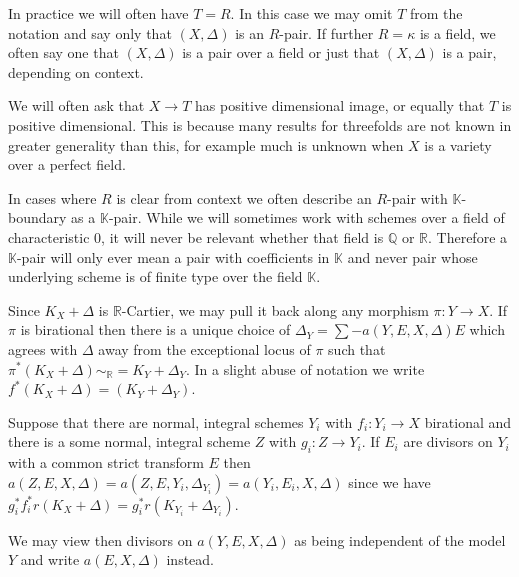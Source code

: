 \documentclass[a4paper,12pt]{book}
\begin{document}
%	

In practice we will often have $T=R$. In this case we may omit $T$ from the notation and say only that $(X,\Delta)$ is an $R$-pair. If further $R=\kappa$ is a field, we often say one that $(X,\Delta)$ is a pair over a field or just that $(X,\Delta)$ is a pair, depending on context.

We will often ask that $X \to T$ has positive dimensional image, or equally that $T$ is positive dimensional. This is because many results for threefolds are not known in greater generality than this, for example much is unknown when $X$ is a variety over a perfect field.

In cases where $R$ is clear from context we often describe an $R$-pair with $\mathbb{K}$-boundary as a $\mathbb{K}$-pair. While we will sometimes work with schemes over a field of characteristic $0$, it will never be relevant whether that field is $\mathbb{Q}$ or $\mathbb{R}$. Therefore a $\mathbb{K}$-pair will only ever mean a pair with coefficients in $\mathbb{K}$ and never pair whose underlying scheme is of finite type over the field $\mathbb{K}$. 

Since $K_{X}+\Delta$ is $\mathbb{R}$-Cartier, we may pull it back along any morphism $\pi\colon  Y \to X$. If $\pi$ is birational then there is a unique choice of $\Delta_{Y}=\sum -a(Y,E,X,\Delta)E$ which agrees with $\Delta$ away from the exceptional locus of $\pi$ such that $\pi^{*}(K_{X}+\Delta)\sim_{\mathbb{R}}=K_{Y}+\Delta_{Y}$. In a slight abuse of notation we write $f^{*}(K_{X}+\Delta)=(K_{Y}+ \Delta_{Y})$.

Suppose that there are normal, integral schemes $Y_{i}$ with $f_{i}:Y_{i} \to X$ birational and there is a some normal, integral scheme $Z$ with $g_{i}:Z\to Y_{i}$. If $E_{i}$ are divisors on $Y_{i}$ with a common strict transform $E$ then $a(Z,E,X,\Delta)=a(Z,E,Y_{i},\Delta_{Y_{i}})=a(Y_{i},E_{i},X,\Delta)$ since we have $g_{i}^{*}f_{i}^{*}r(K_{X}+\Delta)=g_{i}^{*}r(K_{Y_{i}}+\Delta_{Y_{i}})$.

We may view then divisors on $a(Y,E,X,\Delta)$ as being independent of the model $Y$ and write $a(E,X,\Delta)$ instead. 
\end{document}
